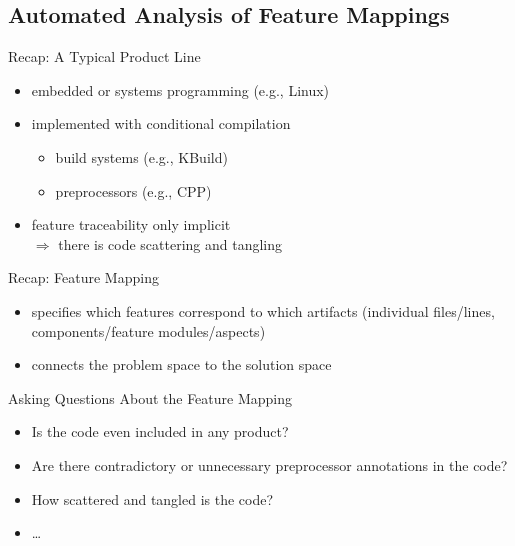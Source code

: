 
\newcommand{\notleftright}{\mathrel{\ooalign{$\Leftrightarrow$\cr\hidewidth$/$\hidewidth}}}

\subsection{Automated Analysis of Feature Mappings}

\begin{frame}{\myframetitle}
	\begin{fancycolumns}[widths={45,55}]
		\begin{note}{Recap: A Typical Product Line}
			\begin{itemize}
				\item embedded or systems programming (e.g., Linux)
				\item implemented with conditional compilation
				\begin{itemize}
					\item build systems (e.g., KBuild)
					\item preprocessors (e.g., CPP)
				\end{itemize}
				\item feature traceability only implicit\\
					$\Rightarrow$ there is code scattering and tangling
			\end{itemize}
		\end{note}
		\begin{definition}{Recap: Feature Mapping}
			\begin{itemize}
				\item specifies which features correspond to which artifacts (individual files/lines, components/feature modules/aspects)
				\item connects the problem space to the solution space
			\end{itemize}
		\end{definition}
		\nextcolumn
		\begin{example}{Asking Questions About the Feature Mapping}
			\begin{itemize}
				\item Is the code even included in any product?
				\item Are there contradictory or unnecessary preprocessor annotations in the code?
				\item How scattered and tangled is the code?
				\item \ldots
			\end{itemize}
		\end{example}
	\end{fancycolumns}
\end{frame}

